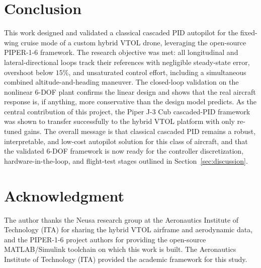 \documentclass{ieeeaccess}
\begin{document}
\section{Conclusion}
\label{sec:conclusion}

This work designed and validated a classical cascaded PID autopilot for the fixed-wing cruise mode of a custom hybrid VTOL drone, leveraging the open-source PIPER-1-6 framework. The research objective was met: all longitudinal and lateral-directional loops track their references with negligible steady-state error, overshoot below $15\%$, and unsaturated control effort, including a simultaneous combined altitude-and-heading maneuver. The closed-loop validation on the nonlinear 6-DOF plant confirms the linear design and shows that the real aircraft response is, if anything, more conservative than the design model predicts. As the central contribution of this project, the Piper J-3 Cub cascaded-PID framework was shown to transfer successfully to the hybrid VTOL platform with only re-tuned gains. The overall message is that classical cascaded PID remains a robust, interpretable, and low-cost autopilot solution for this class of aircraft, and that the validated 6-DOF framework is now ready for the controller discretization, hardware-in-the-loop, and flight-test stages outlined in Section~\ref{sec:discussion}.

\section*{Acknowledgment}
The author thanks the Neusa research group at the Aeronautics Institute of Technology (ITA) for sharing the hybrid VTOL airframe and aerodynamic data, and the PIPER-1-6 project authors for providing the open-source MATLAB/Simulink toolchain on which this work is built. The Aeronautics Institute of Technology (ITA) provided the academic framework for this study.




\EOD
\end{document}
